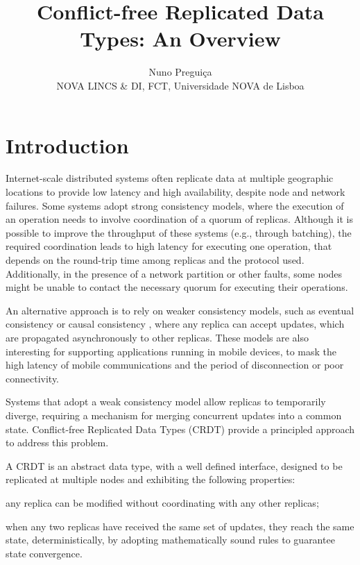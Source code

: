 \documentclass[12pt]{article}
\begin{document}
\date{}

\title{Conflict-free Replicated Data Types: An Overview
}
\author{Nuno Preguiça\\
NOVA LINCS \& DI, FCT, Universidade NOVA de Lisboa}
\maketitle

\section{Introduction}

Internet-scale distributed systems often replicate data at multiple geographic locations
to provide low latency and high availability, despite node and network failures. 
Some systems \cite{spanner,replicatedcommit,farm,mdcc,Zhang13Transaction,blotter} adopt strong consistency models,
where the execution of an operation needs to involve coordination of a quorum of replicas.
Although it is possible to improve the throughput of these systems
(e.g., through batching), the required coordination leads to high latency for executing one operation,
that depends on the round-trip time among replicas and the protocol used.
Additionally, in the presence of a network partition or other faults, some nodes
might be unable to contact the necessary quorum for executing their operations.

An alternative approach is to rely on weaker consistency models, such as 
eventual consistency \cite{dynamo,lotusnotes,cassandra} or causal 
consistency \cite{cops,chainreaction,swiftcloud}, where any replica can 
accept updates, which are propagated asynchronously to other replicas. 
These models are also interesting for supporting applications running in mobile devices, 
to mask the high latency of mobile communications and the period of disconnection or poor
connectivity.

Systems that adopt a weak consistency model allow replicas to temporarily diverge, 
requiring a mechanism for merging concurrent updates into a common state. 
Conflict-free Replicated Data Types (CRDT) provide a principled approach to address this problem.

A CRDT is an abstract data type, with a well defined interface,
designed to be replicated at multiple nodes and exhibiting the following properties:
\begin{inparaenum}[(i)]
\item any replica can be modified without coordinating with any other replicas;
\item when any two replicas have received the same set of updates, 
they reach the same state, deterministically, 
by adopting mathematically sound rules to guarantee state convergence. 
\end{inparaenum}
\end{document}
